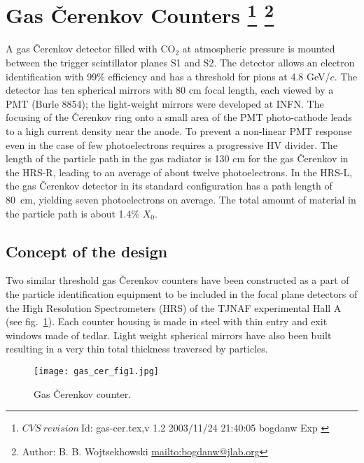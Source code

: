 
\section[Gas \c{C}erenkov Counters]{Gas \v{C}erenkov Counters
\footnote{
  $CVS~revision~ $Id: gas-cer.tex,v 1.2 2003/11/24 21:40:05 bogdanw Exp $ $
}
\footnote{Author: B. B. Wojtsekhowski \url{mailto:bogdanw@jlab.org}}
}

A gas \v{C}erenkov detector filled  with CO$_{2}$ at atmospheric 
pressure is mounted between the trigger scintillator planes S1 and S2. 
The detector allows an electron identification
with 99\% efficiency and has a threshold for pions at 4.8 GeV/$c$.
The detector has ten spherical mirrors with 80 cm focal length, each
viewed by a PMT (Burle 8854);
the light-weight mirrors were developed at INFN.
The focusing of the \v{C}erenkov ring onto a
small area of the PMT photo-cathode leads to a high current density  near
the anode. To prevent a non-linear PMT response even in the case of few
photoelectrons requires a progressive HV divider.
The length of the particle path in the gas radiator is 130 cm for the gas
\v{C}erenkov in the HRS-R, leading to an average of about twelve photoelectrons.
In the HRS-L, the gas \v{C}erenkov detector in its standard configuration has
a path length of 80~cm, yielding seven photoelectrons on average.
The total amount of material in the particle path is about 1.4\% $X_0$.

\subsection[Concept of the design]{Concept of the design}

Two similar threshold gas \v{C}erenkov counters have been constructed 
as a part of the particle identification equipment to be included 
in the focal plane detectors of the High Resolution Spectrometers (HRS) 
of the TJNAF experimental Hall A (see fig.~\ref{fig:gas-counter}). 
Each counter housing is made in steel with thin entry and 
exit windows made of tedlar.
Light weight spherical mirrors have also been built resulting in 
a very thin total thickness traversed by particles. 
%
\begin{figure}[p]
\texttt{[image: gas\_cer\_fig1.jpg]}
\caption[Gas \v{C}erenkov counter]
{Gas \v{C}erenkov counter.}
\label{fig:gas-counter}
\end{figure}

